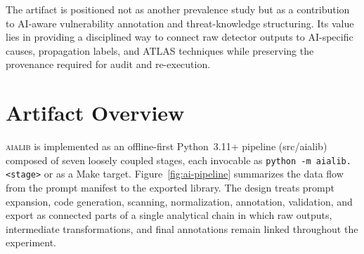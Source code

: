 \documentclass[sigconf,review,anonymous=false]{acmart}
\begin{document}
The artifact is positioned not as another prevalence study but as a
contribution to AI-aware vulnerability annotation and threat-knowledge
structuring. Its value lies in providing a disciplined way to connect
raw detector outputs to AI-specific causes, propagation labels, and
ATLAS techniques while preserving the provenance required for audit and
re-execution.


\section{Artifact Overview}

\textsc{aialib} is implemented as an offline-first Python~3.11+
pipeline (src/aialib) composed of seven loosely coupled
stages, each invocable as \texttt{python\,-m\,aialib.<stage>} or as a
Make target. Figure~\ref{fig:ai-pipeline} summarizes the data flow from the prompt manifest to the exported library. The design treats prompt
expansion, code generation, scanning, normalization, annotation,
validation, and export as connected parts of a single analytical
chain in which raw outputs, intermediate transformations, and final
annotations remain linked throughout the experiment.
\end{document}
